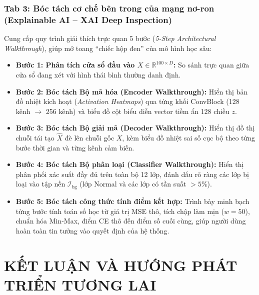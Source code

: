 \documentclass[11pt,journal,onecolumn]{IEEEtran}
\begin{document}
\subsubsection{Tab 3: Bóc tách cơ chế bên trong của mạng nơ-ron (Explainable AI -- XAI Deep Inspection)}
Cung cấp quy trình giải thích trực quan 5 bước (\textit{5-Step Architectural Walkthrough}), giúp mở toang ``chiếc hộp đen'' của mô hình học sâu:
\begin{itemize}
    \item \textbf{Bước 1: Phân tích cửa sổ đầu vào $X \in \mathbb{R}^{100 \times D}$:} So sánh trực quan giữa cửa sổ đang xét với hình thái bình thường danh định.
    \item \textbf{Bước 2: Bóc tách Bộ mã hóa (Encoder Walkthrough):} Hiển thị bản đồ nhiệt kích hoạt (\textit{Activation Heatmaps}) qua từng khối ConvBlock (128 kênh $\rightarrow$ 256 kênh) và biểu đồ cột biểu diễn vector tiềm ẩn 128 chiều $z$.
    \item \textbf{Bước 3: Bóc tách Bộ giải mã (Decoder Walkthrough):} Hiển thị đồ thị chuỗi tái tạo $\hat{X}$ đè lên chuỗi gốc $X$, kèm biểu đồ nhiệt sai số cục bộ theo từng bước thời gian và từng kênh cảm biến.
    \item \textbf{Bước 4: Bóc tách Bộ phân loại (Classifier Walkthrough):} Hiển thị phân phối xác suất đầy đủ trên toàn bộ 12 lớp, đánh dấu rõ ràng các lớp bị loại vào tập nền $\mathcal{I}_{\text{bg}}$ (lớp Normal và các lớp có tần suất $> 5\%$).
    \item \textbf{Bước 5: Bóc tách công thức tính điểm kết hợp:} Trình bày minh bạch từng bước tính toán số học từ giá trị MSE thô, tích chập làm mịn ($w=50$), chuẩn hóa Min-Max, điểm CE thô đến điểm số cuối cùng, giúp người dùng hoàn toàn tin tưởng vào quyết định của hệ thống.
\end{itemize}






\section{KẾT LUẬN VÀ HƯỚNG PHÁT TRIỂN TƯƠNG LAI}
\label{sec:chapter7}
\end{document}
